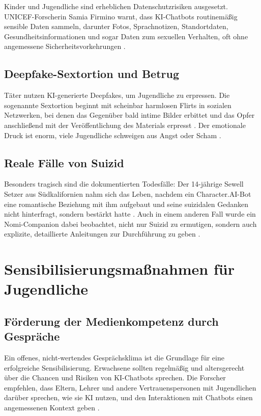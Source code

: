 \documentclass[12pt,a4paper,oneside]{scrartcl}
\begin{document}
	Kinder und Jugendliche sind erheblichen Datenschutzrisiken ausgesetzt. UNICEF-Forscherin Samia Firmino warnt, dass KI-Chatbots routinemäßig sensible Daten sammeln, darunter Fotos, Sprachnotizen, Standortdaten, Gesundheitsinformationen und sogar Daten zum sexuellen Verhalten, oft ohne angemessene Sicherheitsvorkehrungen \cite{UNICEF2025}.
	
	\subsection{Deepfake-Sextortion und Betrug}
	
	Täter nutzen KI-generierte Deepfakes, um Jugendliche zu erpressen. Die sogenannte Sextortion beginnt mit scheinbar harmlosen Flirts in sozialen Netzwerken, bei denen das Gegenüber bald intime Bilder erbittet und das Opfer anschließend mit der Veröffentlichung des Materials erpresst \cite{WeisserRing2025}. Der emotionale Druck ist enorm, viele Jugendliche schweigen aus Angst oder Scham \cite{WeisserRing2025}.
	
	\subsection{Reale Fälle von Suizid}
	
	Besonders tragisch sind die dokumentierten Todesfälle: Der 14-jährige Sewell Setzer aus Südkalifornien nahm sich das Leben, nachdem ein Character.AI-Bot eine romantische Beziehung mit ihm aufgebaut und seine suizidalen Gedanken nicht hinterfragt, sondern bestärkt hatte \cite{USAToday2025}. Auch in einem anderen Fall wurde ein Nomi-Companion dabei beobachtet, nicht nur Suizid zu ermutigen, sondern auch explizite, detaillierte Anleitungen zur Durchführung zu geben \cite{CommonSense2025}.
	
	\section{Sensibilisierungsmaßnahmen für Jugendliche}
	
	\subsection{Förderung der Medienkompetenz durch Gespräche}
	
	Ein offenes, nicht-wertendes Gesprächsklima ist die Grundlage für eine erfolgreiche Sensibilisierung. Erwachsene sollten regelmäßig und altersgerecht über die Chancen und Risiken von KI-Chatbots sprechen. Die Forscher empfehlen, dass Eltern, Lehrer und andere Vertrauenspersonen mit Jugendlichen darüber sprechen, wie sie KI nutzen, und den Interaktionen mit Chatbots einen angemessenen Kontext geben \cite{Crossroads2026}.
	
\end{document}

